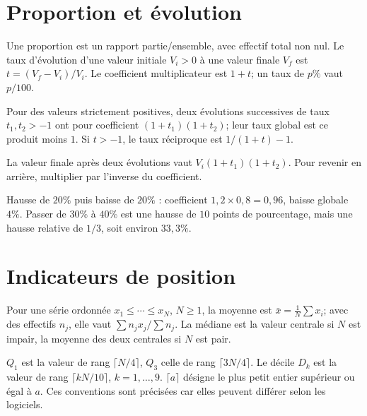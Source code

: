 \section{Proportion et évolution}
\begin{definition}Une proportion est un rapport partie/ensemble, avec effectif total non nul. Le taux d’évolution d’une valeur initiale $V_i>0$ à une valeur finale $V_f$ est $t=(V_f-V_i)/V_i$. Le coefficient multiplicateur est $1+t$; un taux de $p\%$ vaut $p/100$.\end{definition}
\begin{propriete}Pour des valeurs strictement positives, deux évolutions successives de taux $t_1,t_2>-1$ ont pour coefficient $(1+t_1)(1+t_2)$; leur taux global est ce produit moins $1$. Si $t>-1$, le taux réciproque est $1/(1+t)-1$.\end{propriete}
\begin{demonstration}La valeur finale après deux évolutions vaut $V_i(1+t_1)(1+t_2)$. Pour revenir en arrière, multiplier par l’inverse du coefficient.\end{demonstration}
\begin{exemple}Hausse de $20\%$ puis baisse de $20\%$ : coefficient $1{,}2\times0{,}8=0{,}96$, baisse globale $4\%$. Passer de $30\%$ à $40\%$ est une hausse de $10$ points de pourcentage, mais une hausse relative de $1/3$, soit environ $33{,}3\%$.\end{exemple}
\section{Indicateurs de position}
\begin{definition}Pour une série ordonnée $x_1\le\cdots\le x_N$, $N\ge1$, la moyenne est $\bar x=\frac1N\sum x_i$; avec des effectifs $n_j$, elle vaut $\sum n_jx_j/\sum n_j$. La médiane est la valeur centrale si $N$ est impair, la moyenne des deux centrales si $N$ est pair.\end{definition}
\begin{definition}
$Q_1$ est la valeur de rang $\lceil N/4\rceil$, $Q_3$ celle de rang $\lceil3N/4\rceil$. Le décile $D_k$ est la valeur de rang $\lceil kN/10\rceil$, $k=1,\ldots,9$. $\lceil a\rceil$ désigne le plus petit entier supérieur ou égal à $a$. Ces conventions sont précisées car elles peuvent différer selon les logiciels.
\end{definition}
